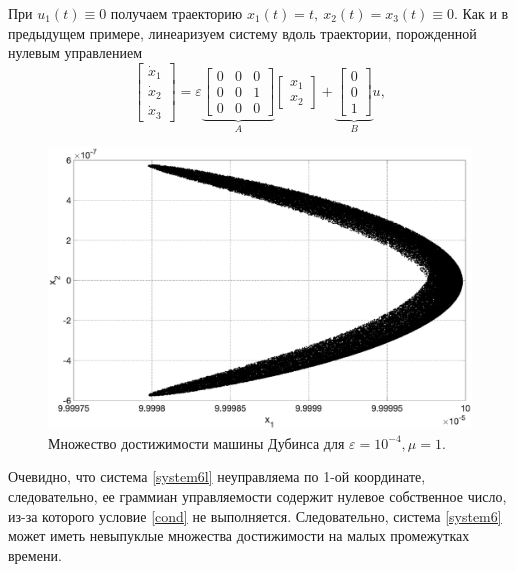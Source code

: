 \documentclass[../main.tex]{subfiles}
\begin{document}
При $  u_1(t) \equiv 0 $ получаем траекторию $ x_1(t) = t, \ x_2(t) = x_3(t) \equiv 0 $. Как и в предыдущем примере, линеаризуем систему вдоль траектории, порожденной нулевым управлением
\begin{equation}\label{system6l}
	\left[ {\begin{array}{*{20}{c}}
			{{{\dot x}_1}}\\
			{{{\dot x}_2}}\\
			{{{\dot x}_3}}
	\end{array}} \right] = \varepsilon \underbrace {\left[ {\begin{array}{*{20}{c}}
				0&0&0\\
				0&0&1\\
				0&0&0
		\end{array}} \right]}_A\left[ {\begin{array}{*{20}{c}}
			{{x_1}}\\
			{{x_2}}
	\end{array}} \right] + \underbrace {\left[ {\begin{array}{*{20}{c}}
				0\\
				0\\
				1
		\end{array}} \right]}_Bu ,
\end{equation}
\begin{figure}[h]
	\centering
	\includegraphics[width=1\linewidth]{images/fig52.eps}
	\caption{Множество достижимости машины Дубинса для $\varepsilon = 10^{-4}, \mu = 1$.}
	\label{fig:fig3}
\end{figure}
Очевидно, что система \eqref{system6l} неуправляема по 1-ой координате, следовательно, ее граммиан управляемости содержит нулевое собственное число, из-за которого условие \eqref{cond} не выполняется. Следовательно, система \eqref{system6} может иметь невыпуклые множества достижимости на малых промежутках времени.
\end{document}
